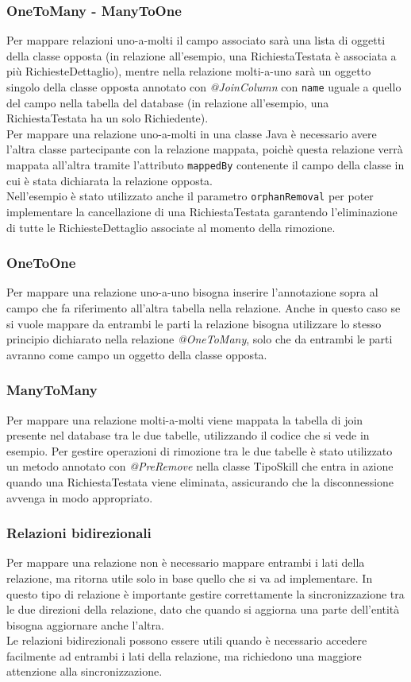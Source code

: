 \subsubsection*{OneToMany - ManyToOne}
Per mappare relazioni uno-a-molti il campo associato sarà una lista di oggetti della classe opposta (in relazione all'esempio, una RichiestaTestata è associata a più RichiesteDettaglio), mentre nella relazione molti-a-uno sarà un oggetto singolo della classe opposta annotato con \textit{@JoinColumn} con \texttt{name} uguale a quello del campo nella tabella del database (in relazione all'esempio, una RichiestaTestata ha un solo Richiedente).\\
Per mappare una relazione uno-a-molti in una classe Java è necessario avere l'altra classe partecipante con la relazione mappata, poichè questa relazione verrà mappata all'altra tramite l'attributo \texttt{mappedBy} contenente il campo della classe in cui è stata dichiarata la relazione opposta.\\
Nell'esempio è stato utilizzato anche il parametro \texttt{orphanRemoval} per poter implementare la cancellazione di una RichiestaTestata garantendo l'eliminazione di tutte le RichiesteDettaglio associate al momento della rimozione.

\subsubsection*{OneToOne}
Per mappare una relazione uno-a-uno bisogna inserire l'annotazione sopra al campo che fa riferimento all'altra tabella nella relazione. Anche in questo caso se si vuole mappare da entrambi le parti la relazione bisogna utilizzare lo stesso principio dichiarato nella relazione \textit{@OneToMany}, solo che da entrambi le parti avranno come campo un oggetto della classe opposta.

\subsubsection*{ManyToMany}
Per mappare una relazione molti-a-molti viene mappata la tabella di join presente nel database tra le due tabelle, utilizzando il codice che si vede in esempio.
Per gestire operazioni di rimozione tra le due tabelle è stato utilizzato un metodo annotato con \textit{@PreRemove} nella classe TipoSkill che entra in azione quando una RichiestaTestata viene eliminata, assicurando che la disconnessione avvenga in modo appropriato.

\subsubsection*{Relazioni bidirezionali}
Per mappare una relazione non è necessario mappare entrambi i lati della relazione, ma ritorna utile solo in base quello che si va ad implementare. In questo tipo di relazione è importante gestire correttamente la sincronizzazione tra le due direzioni della relazione, dato che quando si aggiorna una parte dell'entità bisogna aggiornare anche l'altra.\\
Le relazioni bidirezionali possono essere utili quando è necessario accedere facilmente ad entrambi i lati della relazione, ma richiedono una maggiore attenzione alla sincronizzazione.

